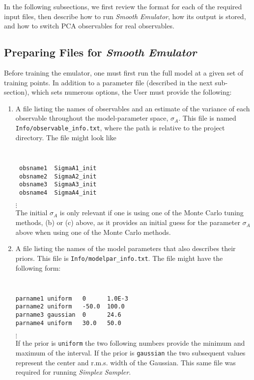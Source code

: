 \documentclass[UserManual.tex]{subfiles}
\begin{document}
In the following subsections, we first review the format for each of the required input files, then describe how to run {\it Smooth Emulator}, how its output is stored, and how to switch PCA observables for real observables.

\subsection{Preparing Files for {\it Smooth Emulator}}

Before training the emulator, one must first run the full model at a given set of training points. In addition to a parameter file (described in the next sub-section), which sets numerous options, the User must provide the following:
\begin{enumerate}\itemsep=0pt
\item A file listing the names of observables and an estimate of the variance of each observable throughout the model-parameter space, $\sigma_A$. This file is named {\tt Info/observable\_info.txt}, where the path is relative to the project directory. The file might look like
{\tt
\begin{verbatim}
 obsname1  SigmaA1_init
 obsname2  SigmaA2_init
 obsname3  SigmaA3_init
 obsname4  SigmaA4_init 
\end{verbatim}}
\vspace*{-16pt}
 \hspace*{28pt}$\vdots$\\
The initial $\sigma_A$ is only relevant if one is using one of the Monte Carlo tuning methods, (b) or (c) above, as it provides an initial guess for the parameter $\sigma_A$ above when using one of the Monte Carlo methods.

\item A file listing the names of the model parameters that also describes their priors. This file is {\tt Info/modelpar\_info.txt}. The file might have the following form:
{\tt
\begin{verbatim}
parname1 uniform   0      1.0E-3
parname2 uniform   -50.0  100.0
parname3 gaussian  0      24.6
parname4 uniform   30.0   50.0
\end{verbatim}}
\vspace*{-16pt}
 \hspace*{28pt}$\vdots$\\
If the prior is {\tt uniform} the two following numbers provide the minimum and maximum of the interval. If the prior is {\tt gaussian} the two subsequent values represent the center and r.m.s. width of the Gaussian. This same file was required for running {\it Simplex Sampler}.


\end{enumerate}
\end{document}
